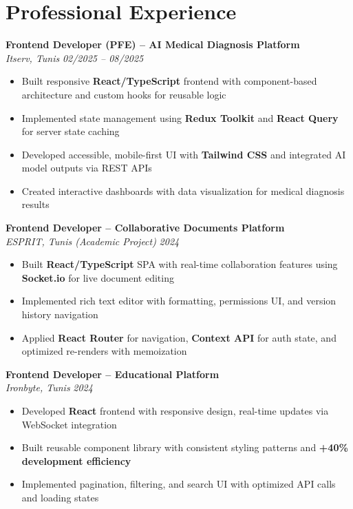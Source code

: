 \documentclass[10pt,a4paper]{article}
\begin{document}
\vspace{6pt}

\section*{Professional Experience}
{\small

\textbf{Frontend Developer (PFE) -- AI Medical Diagnosis Platform}\\[1pt]
\textit{Itserv, Tunis} \hfill \textit{02/2025 -- 08/2025}
\begin{itemize}
  \item Built responsive \textbf{React/TypeScript} frontend with component-based architecture and custom hooks for reusable logic
  \item Implemented state management using \textbf{Redux Toolkit} and \textbf{React Query} for server state caching
  \item Developed accessible, mobile-first UI with \textbf{Tailwind CSS} and integrated AI model outputs via REST APIs
  \item Created interactive dashboards with data visualization for medical diagnosis results
\end{itemize}

\vspace{3pt}
\textbf{Frontend Developer -- Collaborative Documents Platform}\\[1pt]
\textit{ESPRIT, Tunis (Academic Project)} \hfill \textit{2024}
\begin{itemize}
  \item Built \textbf{React/TypeScript} SPA with real-time collaboration features using \textbf{Socket.io} for live document editing
  \item Implemented rich text editor with formatting, permissions UI, and version history navigation
  \item Applied \textbf{React Router} for navigation, \textbf{Context API} for auth state, and optimized re-renders with memoization
\end{itemize}

\vspace{3pt}
\textbf{Frontend Developer -- Educational Platform}\\[1pt]
\textit{Ironbyte, Tunis} \hfill \textit{2024}
\begin{itemize}
  \item Developed \textbf{React} frontend with responsive design, real-time updates via WebSocket integration
  \item Built reusable component library with consistent styling patterns and \textbf{+40\% development efficiency}
  \item Implemented pagination, filtering, and search UI with optimized API calls and loading states
\end{itemize}

}
\end{document}
